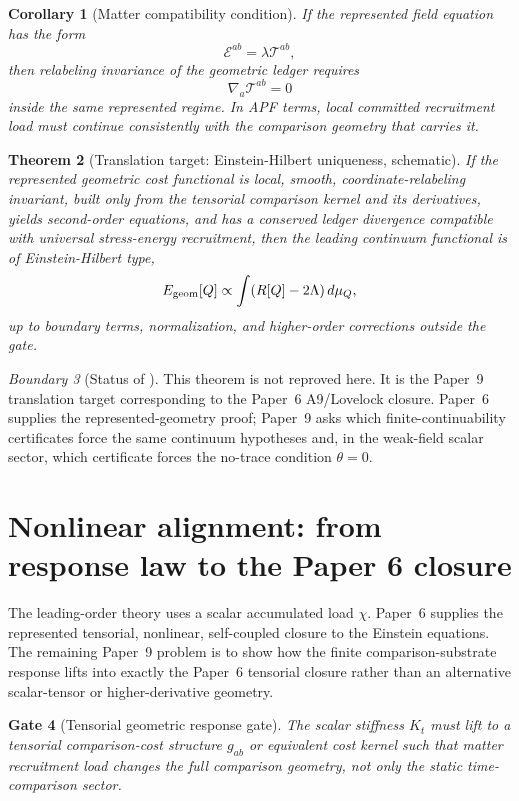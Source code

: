 \documentclass[11pt]{article}
\newtheorem{theorem}{Theorem}[section]
\newtheorem{corollary}[theorem]{Corollary}
\newtheorem{gate}[theorem]{Gate}
\theoremstyle{remark}
\newtheorem{warning}[theorem]{Boundary}
\newcommand{\Egeom}{E_{\rm geom}}
\begin{document}
\begin{corollary}[Matter compatibility condition]
If the represented field equation has the form
\[
        \mathcal E^{ab}=\lambda \mathcal T^{ab},
\]
then relabeling invariance of the geometric ledger requires
\[
        \nabla_a\mathcal T^{ab}=0
\]
inside the same represented regime.  In APF terms, local committed recruitment load must continue consistently with the comparison geometry that carries it.
\end{corollary}

\begin{theorem}[Translation target: Einstein-Hilbert uniqueness, schematic]
\label{thm:target-eh}
If the represented geometric cost functional is local, smooth, coordinate-relabeling invariant, built only from the tensorial comparison kernel and its derivatives, yields second-order equations, and has a conserved ledger divergence compatible with universal stress-energy recruitment, then the leading continuum functional is of Einstein-Hilbert type,
\[
        \Egeom[Q]\propto \int (R[Q]-2\Lambda)\,d\mu_Q,
\]
up to boundary terms, normalization, and higher-order corrections outside the gate.
\end{theorem}

\begin{warning}[Status of ]
This theorem is not reproved here.  It is the Paper~9 translation target corresponding to the Paper~6 A9/Lovelock closure.  Paper~6 supplies the represented-geometry proof; Paper~9 asks which finite-continuability certificates force the same continuum hypotheses and, in the weak-field scalar sector, which certificate forces the no-trace condition \(\theta=0\).
\end{warning}

\section{Nonlinear alignment: from response law to the Paper 6 closure}

The leading-order theory uses a scalar accumulated load \(\chi\).  Paper~6 supplies the represented tensorial, nonlinear, self-coupled closure to the Einstein equations.  The remaining Paper~9 problem is to show how the finite comparison-substrate response lifts into exactly the Paper~6 tensorial closure rather than an alternative scalar-tensor or higher-derivative geometry.

\begin{gate}[Tensorial geometric response gate]
The scalar stiffness \(K_t\) must lift to a tensorial comparison-cost structure \(g_{ab}\) or equivalent cost kernel such that matter recruitment load changes the full comparison geometry, not only the static time-comparison sector.
\end{gate}
\end{document}

